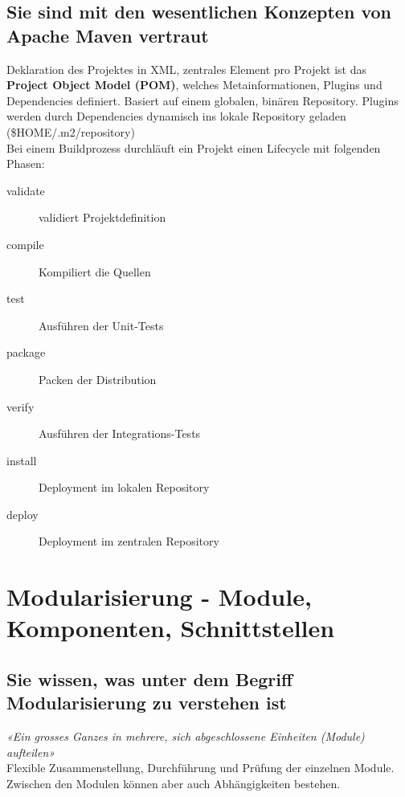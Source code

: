 \documentclass[a4paper]{article}
\begin{document}
		\subsection{Sie sind mit den wesentlichen Konzepten von Apache Maven vertraut}
		Deklaration des Projektes in XML, zentrales Element pro Projekt ist das \textbf{Project Object Model (POM)}, welches Metainformationen, Plugins und Dependencies definiert. 
		Basiert auf einem globalen, binären Repository. Plugins werden durch Dependencies dynamisch ins lokale Repository geladen (\$HOME/.m2/repository)\\
		Bei einem Buildprozess durchläuft ein Projekt einen Lifecycle mit folgenden Phasen:\\
		\begin{description}
			\item[validate] validiert Projektdefinition
			\item[compile] Kompiliert die Quellen
			\item[test] Ausführen der Unit-Tests
			\item[package] Packen der Distribution
			\item[verify] Ausführen der Integrations-Tests
			\item[install] Deployment im lokalen Repository
			\item[deploy] Deployment im zentralen Repository
		\end{description}

	\newpage
	\section{Modularisierung - Module, Komponenten, Schnittstellen}
	
	\subsection{Sie wissen, was unter dem Begriff Modularisierung zu verstehen ist}
	\textit{«Ein grosses Ganzes in mehrere, sich abgeschlossene Einheiten (Module) aufteilen»} \\
	Flexible Zusammenstellung, Durchführung und Prüfung der einzelnen Module. 
	Zwischen den Modulen können aber auch Abhängigkeiten bestehen.
	
\end{document}
